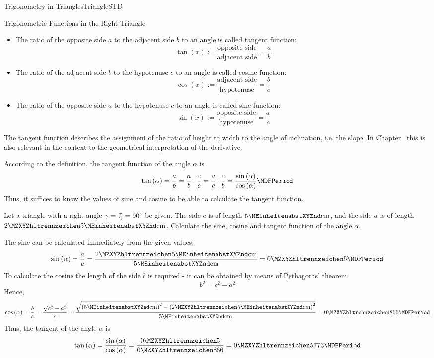\begin{MXContent}{Trigonometry in Triangles}{Triangle}{STD}
\begin{MXInfo}{Trigonometric Functions in the Right Triangle}
\begin{itemize}
\item
The ratio of the opposite side $a$ to the adjacent side $b$ to an angle 
is called tangent function:
\[
\tan(x) := \frac{\text{opposite side}}{\text{adjacent side}} = \frac{a}{b} %
\]
%
\item
The ratio of the adjacent side $b$ to the hypotenuse $c$ to an angle 
is called cosine function:
\[
\cos(x) := \frac{\text{adjacent side}}{\text{hypotenuse}} = \frac{b}{c} %
\]
%
\item
The ratio of the opposite side $a$ to the hypotenuse $c$ 
to an angle is called sine function:
\[
\sin(x) := \frac{\text{opposite side}}{\text{hypotenuse}} = \frac{a}{c} %
\]
\end{itemize}
\end{MXInfo}

The tangent function describes the assignment of the ratio 
of height to width to the angle of inclination, i.e. the slope. In 
Chapter~ this is also relevant in the context to the 
geometrical interpretation of the derivative.

According to the definition, the tangent function of the angle 
$\alpha$ is
\[
\tan\left(\alpha\right)=\frac{a}{b}=\frac{a}{b}\cdot\frac{c}{c} %
 =\frac{a}{c}\cdot\frac{c}{b} %
 =\frac{\sin\left(\alpha\right)}{\cos\left(\alpha\right)} \MDFPeriod %
\]
Thus, it suffices to know the values of sine and cosine   
to be able to calculate the tangent function.

\begin{MExample}
Let a triangle with a right angle $\gamma=\frac{\pi}{2}=90^{\circ}$ be given.
The side $c$ is of length $5\MEinheit{cm}$, and the side $a$ is of length 
$\MZahl{2}{5}\MEinheit{cm}$. Calculate the sine, cosine and tangent function 
of the angle $\alpha$.

The sine can be calculated immediately from the given values:
\[
\sin\left(\alpha\right)=\frac{a}{c}
 =\frac{\MZahl{2}{5}\MEinheit{cm}}{5\MEinheit{cm}}=\MZahl{0}{5} \MDFPeriod\]
To calculate the cosine the length of the side $b$ is required - it can be obtained
by means of Pythagoras' theorem:
\[
b^2 = c^2 - a^2 %
\]
Hence,
\[
\cos\left(\alpha\right)=\frac{b}{c}=\frac{\sqrt{c^2-a^2}}{c} %
 =\frac{\sqrt{\left(5\MEinheit{cm}\right)^2 - \left(\MZahl{2}{5}\MEinheit{cm}\right)^2}}{5\MEinheit{cm}}=\MZahl{0}{866} \MDFPeriod %
\]
Thus, the tangent of the angle $\alpha$ is 
\[
\tan\left(\alpha\right) %
 =\frac{\sin\left(\alpha\right)}{\cos\left(\alpha\right)} %
 =\frac{\MZahl{0}{5}}{\MZahl{0}{866}}=\MZahl{0}{5773} \MDFPeriod
\]
\end{MExample}



\end{MXContent}
